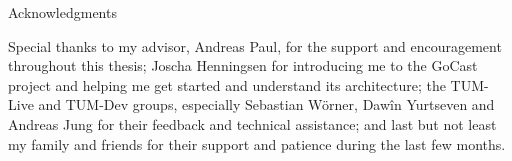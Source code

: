 \thispagestyle{empty}

\vspace*{20mm}

\begin{center}
    { Acknowledgments}
\end{center}

\vspace{10mm}

\noindent Special thanks to my advisor, Andreas Paul, for the support and encouragement throughout this thesis; Joscha Henningsen for introducing me to the GoCast project and helping me get started and understand its architecture; the TUM-Live and TUM-Dev groups, especially Sebastian Wörner, Dawîn Yurtseven and Andreas Jung for their feedback and technical assistance; and last but not least my family and friends for their support and patience during the last few months.

\cleardoublepage{}
